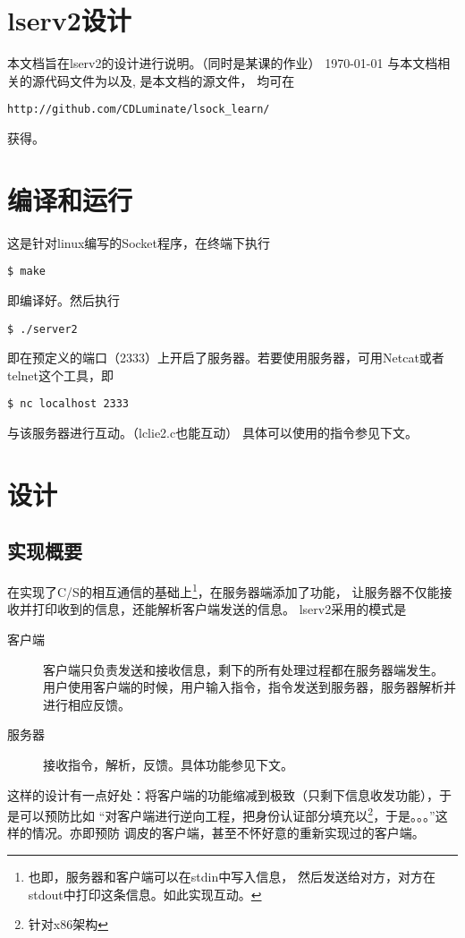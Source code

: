 \documentclass[a4paper,12pt]{article}
\begin{document}
\begin{CJK}{UTF8}{gbsn}

\section*{lserv2设计}
	本文档旨在lserv2的设计进行说明。（同时是某课的作业）\newline
	\today \newline
	与本文档相关的源代码文件为以及, 是本文档的源文件，
	均可在
	\begin{verbatim}
http://github.com/CDLuminate/lsock_learn/
	\end{verbatim}
	获得。

\tableofcontents
\newpage

\section{编译和运行}
	这是针对linux编写的Socket程序，在终端下执行
	\begin{verbatim}
$ make
	\end{verbatim}
	即编译好。然后执行
	\begin{verbatim}
$ ./server2
	\end{verbatim}
	即在预定义的端口（2333）上开启了服务器。若要使用服务器，可用Netcat或者telnet这个工具，即
	\begin{verbatim}
$ nc localhost 2333
	\end{verbatim}
	与该服务器进行互动。（lclie2.c也能互动）\newline
	具体可以使用的指令参见下文。

\newpage
\section{设计}
	\subsection{实现概要}
		在实现了C/S的相互通信的基础上\footnote{也即，服务器和客户端可以在stdin中写入信息，
		然后发送给对方，对方在stdout中打印这条信息。如此实现互动。}，在服务器端添加了功能，
		让服务器不仅能接收并打印收到的信息，还能解析客户端发送的信息。\newline
		lserv2采用的模式是
		\begin{description}
		\item[客户端] 客户端只负责发送和接收信息，剩下的所有处理过程都在服务器端发生。
		用户使用客户端的时候，用户输入指令，指令发送到服务器，服务器解析并进行相应反馈。
		\item[服务器] 接收指令，解析，反馈。具体功能参见下文。
		\end{description}
		这样的设计有一点好处：将客户端的功能缩减到极致（只剩下信息收发功能），于是可以预防比如
		“对客户端进行逆向工程，把身份认证部分填充以\footnote{针对x86架构}，于是。。。”这样的情况。亦即预防
		调皮的客户端，甚至不怀好意的重新实现过的客户端。

\end{CJK}
\end{document}
